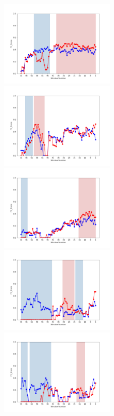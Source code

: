 \documentclass[11pt]{jreport}
\begin{document}
\begin{figure}[H]
\begin{center}
    \includegraphics[width=0.495\textwidth]{Uenaka_fig/RQ2_result/Nova_merge_F1.pdf}
    \includegraphics[width=0.495\textwidth]{Uenaka_fig/RQ2_result/Neutron_merge_F1.pdf}
    \includegraphics[width=0.495\textwidth]{Uenaka_fig/RQ2_result/Cinder_merge_F1.pdf}
    \includegraphics[width=0.495\textwidth]{Uenaka_fig/RQ2_result/Keystone_merge_F1.pdf}
    \includegraphics[width=0.495\textwidth]{Uenaka_fig/RQ2_result/Swift_merge_F1.pdf}

\end{center}
\end{figure}
\end{document}

